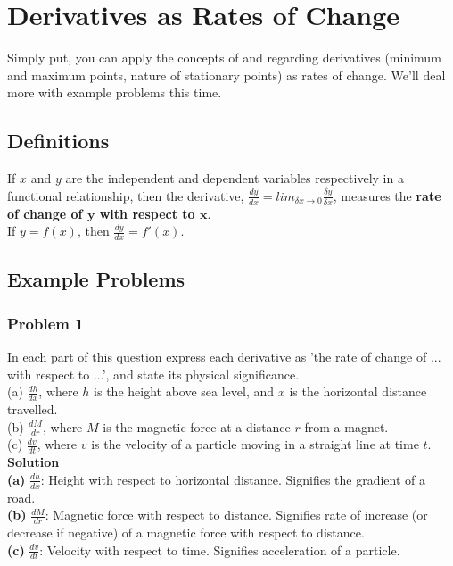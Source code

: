 \documentclass[hidelinks, a4paper, 12pt]{article}
\newcommand{\bd}{\textbf}
\newcommand{\n}{\\[\baselineskip]}
\newcommand{\dydx}{\frac{dy}{dx}}
\begin{document}
    \section{Derivatives as Rates of Change}
        Simply put, you can apply the concepts of and regarding derivatives (minimum and maximum points, nature of stationary points) as rates of change. We'll deal more with example problems this time.
        \subsection{Definitions}
            If $x$ and $y$ are the independent and dependent variables respectively in a functional relationship, then the derivative, $\dydx = lim_{\delta x \to 0} \frac{\delta y}{\delta x}$, measures the \bd{rate of change of $\boldsymbol{y}$ with respect to $\boldsymbol{x}$}.\n
            If $y = f(x)$, then $\dydx = f'(x)$.

        \subsection{Example Problems}
            \subsubsection{Problem 1}
                In each part of this question express each derivative as 'the rate of change of ... with respect to ...', and state its physical significance.\n
                (a) $\frac{dh}{dx}$, where $h$ is the height above sea level, and $x$ is the horizontal distance travelled.\n
                (b) $\frac{dM}{dr}$, where $M$ is the magnetic force at a distance $r$ from a magnet.\n
                (c) $\frac{dv}{dt}$, where $v$ is the velocity of a particle moving in a straight line at time $t$.\n
                \bd{Solution}\n
                \bd{(a)} $\frac{dh}{dx}$: Height with respect to horizontal distance. Signifies the gradient of a road.\n
                \bd{(b)} $\frac{dM}{dr}$: Magnetic force with respect to distance. Signifies rate of increase (or decrease if negative) of a magnetic force with respect to distance.\n
                \bd{(c)} $\frac{dv}{dt}$: Velocity with respect to time. Signifies acceleration of a particle.
            
\end{document}
